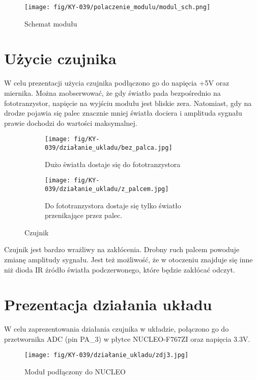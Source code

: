 \documentclass[11pt, a4paper]{article}
\begin{document}
\vspace{0.5cm}
\begin{figure}[h]
  \centering
  \texttt{[image: fig/KY-039/polaczenie\_modulu/modul\_sch.png]}
    \caption{Schemat modułu}
    \label{sch}
\end{figure}


\section{Użycie czujnika}
W celu prezentacji użycia czujnika podłączono go do napięcia +5V oraz miernika. Można zaobserwować, że gdy światło pada bezpośrednio na fototranzystor, napięcie na wyjściu modułu jest bliskie zera. Natomiast, gdy na drodze pojawia się palec znacznie mniej światła dociera i amplituda sygnału prawie dochodzi do wartości maksymalnej. 

\vspace{0.5cm}
\begin{figure}[h]
\centering
\begin{subfigure}{.5\textwidth}
  \centering
  \texttt{[image: fig/KY-039/działanie\_ukladu/bez\_palca.jpg]}
  \caption{Dużo światła dostaje się do fototranzystora}
  \label{fig:sub1}
\end{subfigure}%
\begin{subfigure}{.5\textwidth}
  \centering
    \texttt{[image: fig/KY-039/działanie\_ukladu/z\_palcem.jpg]}
      \caption{Do fototranzystora dostaje się tylko światło przenikające przez palec. }
  \label{zd}
\end{subfigure}
\caption{Czujnik}
\label{fig:test}
\end{figure}
\vspace{0.5cm}

Czujnik jest bardzo wrażliwy na zakłócenia. Drobny ruch palcem powoduje zmianę amplitudy sygnału. Jest też możliwość, że w otoczeniu znajduje się inne niż dioda IR źródło światła podczerwonego, które będzie zakłócać odczyt.

\section{Prezentacja działania układu}
W celu zaprezentowania działania czujnika w układzie, połączono go do przetwornika ADC (pin PA\_3) w płytce NUCLEO-F767ZI oraz napięcia 3.3V. 

\begin{figure}[h]
    \centering
    \texttt{[image: fig/KY-039/działanie\_ukladu/zdj3.jpg]}
    \caption{Moduł podłączony do NUCLEO}
    \label{fig:my_label}
\end{figure}
\end{document}

